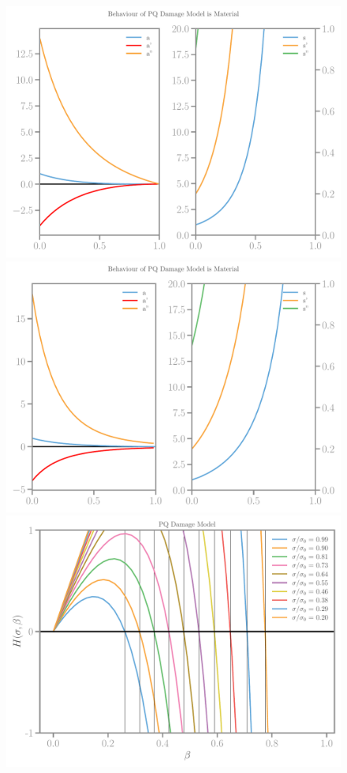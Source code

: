 \documentclass[]{article}
\begin{document}
\begin{figure}[htbp]
  \includegraphics[width=.33\textheight]{../figures/pq-13-model.pdf}
  \includegraphics[width=.33\textheight]{../figures/pq-31-model.pdf}
  \includegraphics[width=.33\textheight]{../figures/pq-Hbeta.pdf}

\end{figure}
\end{document}
